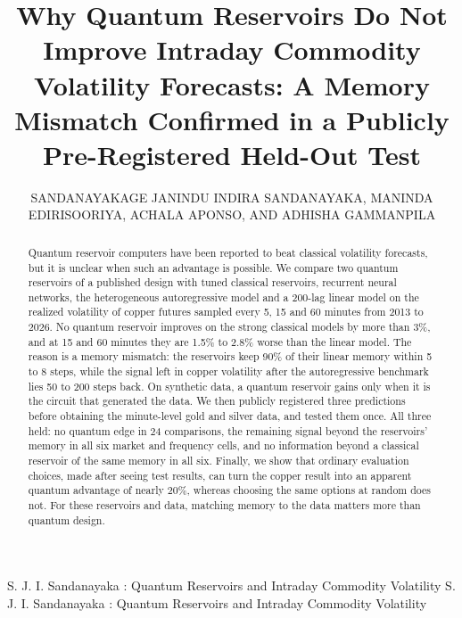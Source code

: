 \documentclass{ieeeaccess}
\begin{document}

\title{Why Quantum Reservoirs Do Not Improve Intraday Commodity Volatility Forecasts: A Memory Mismatch Confirmed in a Publicly Pre-Registered Held-Out Test}

\author{\uppercase{Sandanayakage Janindu Indira Sandanayaka},
\uppercase{Maninda Edirisooriya}, \uppercase{Achala Aponso}, AND \uppercase{Adhisha Gammanpila}}

\address[1]{Informatics Institute of Technology, Colombo, Sri Lanka, in collaboration with the University of Westminster, London, U.K. (e-mail: janindu.20232270@iit.ac.lk)}


\markboth
{S. J. I. Sandanayaka \headeretal: Quantum Reservoirs and Intraday Commodity Volatility}
{S. J. I. Sandanayaka \headeretal: Quantum Reservoirs and Intraday Commodity Volatility}


\begin{abstract}
Quantum reservoir computers have been reported to beat classical volatility forecasts, but it is unclear when such an advantage is possible. We compare two quantum reservoirs of a published design with tuned classical reservoirs, recurrent neural networks, the heterogeneous autoregressive model and a 200-lag linear model on the realized volatility of copper futures sampled every 5, 15 and 60 minutes from 2013 to 2026. No quantum reservoir improves on the strong classical models by more than 3\%, and at 15 and 60 minutes they are 1.5\% to 2.8\% worse than the linear model. The reason is a memory mismatch: the reservoirs keep 90\% of their linear memory within 5 to 8 steps, while the signal left in copper volatility after the autoregressive benchmark lies 50 to 200 steps back. On synthetic data, a quantum reservoir gains only when it is the circuit that generated the data. We then publicly registered three predictions before obtaining the minute-level gold and silver data, and tested them once. All three held: no quantum edge in 24 comparisons, the remaining signal beyond the reservoirs' memory in all six market and frequency cells, and no information beyond a classical reservoir of the same memory in all six. Finally, we show that ordinary evaluation choices, made after seeing test results, can turn the copper result into an apparent quantum advantage of nearly 20\%, whereas choosing the same options at random does not. For these reservoirs and data, matching memory to the data matters more than quantum design.
\end{abstract}
\end{document}
